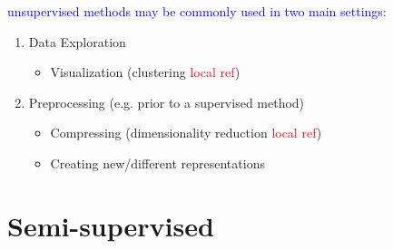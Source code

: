 \textcolor{blue}{unsupervised methods may be commonly used in two main settings:}
\begin{enumerate}
	\item Data Exploration
	\begin{itemize}
		\item Visualization (clustering \textcolor{red}{local ref})
	\end{itemize}
	\item Preprocessing (e.g. prior to a supervised method)
	\begin{itemize}
		\item Compressing (dimensionality reduction \textcolor{red}{local ref})
		\item Creating new/different representations
	\end{itemize}
\end{enumerate}






\chapter{Semi-supervised}


